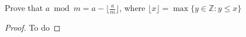 \begin{statement}{1.4}
  Prove that $a \bmod m = a - \lfloor \frac{a}{m} \rfloor$, where
  $\lfloor x \rfloor = \max \{y \in \mathbb{Z} : y \leq x \}$
\end{statement}
\begin{proof}
To do
\end{proof}

